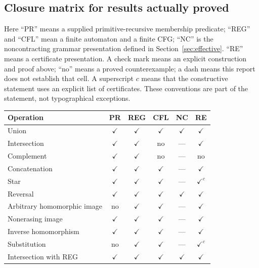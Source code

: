 \subsection{Closure matrix for results actually proved}

Here ``PR'' means a supplied primitive-recursive membership predicate;
``REG'' and ``CFL'' mean a finite automaton and a finite CFG; ``NC'' is the
noncontracting grammar presentation defined in Section~\ref{sec:effective}.
``RE'' means a certificate presentation. A check mark means an explicit
construction and proof above; ``no'' means a proved counterexample;
a dash means this report does not establish that cell. A superscript $c$
means that the constructive statement uses an explicit list of certificates.
These conventions are part of the statement, not typographical exceptions.

\begin{center}\small
\begin{tabular}{@{}p{}ccccc@{}}
\toprule
Operation & PR & REG & CFL & NC & RE\\\midrule
Union & $\checkmark$ & $\checkmark$ & $\checkmark$ & $\checkmark$ & $\checkmark$\\
Intersection & $\checkmark$ & $\checkmark$ & no & --- & $\checkmark$\\
Complement & $\checkmark$ & $\checkmark$ & no & --- & no\\
Concatenation & $\checkmark$ & $\checkmark$ & $\checkmark$ & --- & $\checkmark$\\
Star & $\checkmark$ & $\checkmark$ & $\checkmark$ & --- & $\checkmark^c$\\
Reversal & $\checkmark$ & $\checkmark$ & $\checkmark$ & $\checkmark$ & $\checkmark$\\
Arbitrary homomorphic image & no & $\checkmark$ & $\checkmark$ & --- & $\checkmark$\\
Nonerasing image & $\checkmark$ & $\checkmark$ & $\checkmark$ & --- & $\checkmark$\\
Inverse homomorphism & $\checkmark$ & $\checkmark$ & $\checkmark$ & --- & $\checkmark$\\
Substitution & no & $\checkmark$ & $\checkmark$ & --- & $\checkmark^c$\\
Intersection with REG & $\checkmark$ & $\checkmark$ & $\checkmark$ & $\checkmark$ & $\checkmark$\\
\bottomrule
\end{tabular}
\end{center}

